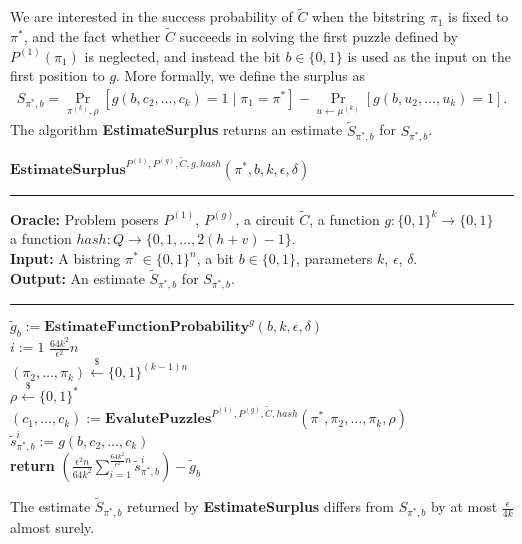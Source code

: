 We are interested in the success probability of $\widetilde{C}$ when the bitstring $\pi_1$ is fixed to $\pi^*$, and
the fact whether $\widetilde{C}$ succeeds in solving the first puzzle defined by $P^{(1)}(\pi_1)$ is neglected, and
instead the bit $b \in \{0,1\}$ is used as the input on the first position to $g$.
More formally, we define the surplus as
\begin{align}
  \label{eq:s_pi_b}
S_{\pi^*, b} = \underset{\pi^{(k)}, \rho}{\Pr}\left[g(b, c_2, \dots, c_k) = 1 \mid \pi_1 = \pi^*\right] - \underset{u \leftarrow \mu^{(k)}}{\Pr}\left[g(b, u_2, \dots, u_k) = 1\right].
\end{align}
%
The algorithm \textbf{EstimateSurplus} returns an estimate $\widetilde{S}_{\pi^*, b}$ for $S_{\pi^*, b}$.
%
\begin{codeblock}
  $\textbf{EstimateSurplus}^{P^{(1)}, P^{(g)}, \widetilde{C}, g, hash}(\pi^*, b, k, \epsilon, \delta)$
  \medskip
  \hrule
  \medskip
  \textbf{Oracle:} Problem posers $P^{(1)}$, $P^{(g)}$, a circuit $\widetilde{C}$, a function $g: \{0,1\}^{k} \rightarrow \{0,1\}$ \\
  \IndII a function $hash : Q \rightarrow \{0,1,\dots, 2(h+v)-1\}$.\\
  \textbf{Input:} A bistring $\pi^* \in \{0,1\}^{n}$, a bit $b \in \{0,1\}$, parameters $k$, $\epsilon$, $\delta$.\\
  \textbf{Output:} An estimate $\widetilde{S}_{\pi^*, b}$ for $S_{\pi^*, b}$.
  \medskip\hrule\medskip
  $\widetilde{g}_b := \textbf{EstimateFunctionProbability}^{g}(b, k, \epsilon, \delta)$ \\
  \For $i:=1$ \To $\frac{64k^2}{\epsilon^2}n$ \Do \\
  \IndI $(\pi_{2}, \dots, \pi_k) \xleftarrow{\$} \{0,1\}^{(k-1)n}$\\
  \IndI $\rho \xleftarrow{\$} \{0,1\}^{*}$\\
  \IndI $(c_1, \dots, c_k) := \textbf{EvalutePuzzles}^{P^{(1)}, P^{(g)}, \widetilde{C}, hash}(\pi^*, \pi_2, \dots, \pi_k, \rho)$\\
  \IndI $\widetilde{s}_{\pi^*,b}^i := g(b, c_{2}, \dots, c_k)$\\
  \textbf{return} $\left(\frac{\epsilon^2 n}{64k^2} \sum_{i=1}^{\frac{64k^2}{\epsilon^2} n} \widetilde{s}_{\pi^*,b}^i \right) - \widetilde{g}_b$\\
\end{codeblock}
%
\begin{lemma}
  \label{lemma:surplus_estimate}
The estimate $\widetilde{S}_{\pi^*,b}$ returned by \textbf{EstimateSurplus} differs from $S_{\pi^*, b}$ by at most $\frac{\epsilon}{4k}$ almost surely.
\end{lemma}

